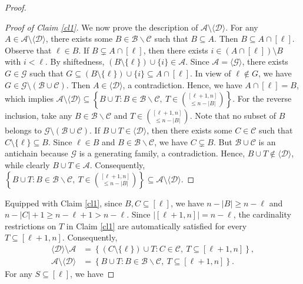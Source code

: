 \documentclass[10pt,a4paper]{amsart}
\begin{document}
\begin{proof}
\begin{proof}[Proof of Claim \ref{cl1}]
We now prove the  description of $\mathcal{A}\setminus\langle\mathcal{D}\rangle$.
For any $A\in\mathcal{A}\setminus\langle\mathcal{D}\rangle$, there exists some $B\in\mathcal{B}\backslash \mathcal{C}$ such that $B\subseteq A$. Then $B\subseteq A\cap[\ell]$.
Observe that $\ell\in B$. 
If $B\subsetneq A\cap[\ell]$, then there exists $i\in(A\cap[\ell])\setminus B$ with $i<\ell$.
By shiftedness, $(B\setminus\{\ell\})\cup\{i\}\in\mathcal{A}$. Since 
$\mathcal{A}= \langle\mathcal{G}\rangle$, there exists $G\in\mathcal{G}$ such that $G\subseteq(B\setminus\{\ell\})\cup\{i\}\subseteq A\cap[\ell]$.
In view of $\ell \notin G$, we have $G\in\mathcal{G}\setminus(\mathcal{B}\cup\mathcal{C})$.
Then $A\in\langle\mathcal{D}\rangle$, a contradiction. Hence, we have $A\cap[\ell]=B$, which implies 
$\mathcal{A}\setminus\langle\mathcal{D}\rangle\subseteq\left\{B\cup T: B\in\mathcal{B}\backslash \mathcal{C},\ T\in\binom{[\ell+1,n]}{\leq n-|B|}\right\}$.
For the reverse inclusion, take any  $B\in\mathcal{B}\backslash \mathcal{C}$ and $ T\in\binom{[\ell+1,n]}{\leq n-|B|}$. Note that no subset of $B$ belongs to $\mathcal{G}\setminus(\mathcal{B}\cup  \mathcal{C})$.
If  $B\cup T \in \langle\mathcal{D}\rangle$, then there exists some  
$C\in\mathcal{C}$ such that $C\setminus\{\ell\}\subseteq B$.
Since $\ell\in B$ and $B\in\mathcal{B}\backslash \mathcal{C}$, we  have $C\subsetneq B$. 
But $\mathcal{B}\cup\mathcal{C}$ is an antichain because $\mathcal{G}$ is a  generating family, a contradiction.
Hence, $B\cup T \notin \langle\mathcal{D}\rangle$, while clearly $B\cup T \in \mathcal{A}$. Consequently,
$\left\{B\cup T: B\in\mathcal{B}\backslash \mathcal{C},\ T\in\binom{[\ell+1,n]}{\leq n-|B|}\right\}\subseteq\mathcal{A}\setminus\langle\mathcal{D}\rangle$.
\end{proof}
Equipped with Claim \ref{cl1}, since $B, C \subseteq [\ell]$, we have   $n-|B| \ge n-\ell$ and $n-|C|+1 \ge n-\ell+1 > n-\ell$. Since $|[\ell+1,n]| = n-\ell$, the cardinality restrictions on $T$ in Claim \ref{cl1} are automatically satisfied for every $T \subseteq [\ell+1,n]$. Consequently, 
\begin{align}
\langle \mathcal{D} \rangle \setminus \mathcal{A} 
&= 
\left\{ (C \setminus \{\ell\}) \cup T : C \in \mathcal{C},\ T \subseteq [\ell+1,n] \right\}, \label{f1} \\
\mathcal{A} \setminus \langle \mathcal{D} \rangle 
&= 
\left\{ B \cup T : B \in \mathcal{B}\backslash \mathcal{C},\ T \subseteq [\ell+1,n] \right\}. \label{f2}
\end{align}
For any $S \subseteq [\ell]$, we have

\end{proof}
\end{document}
